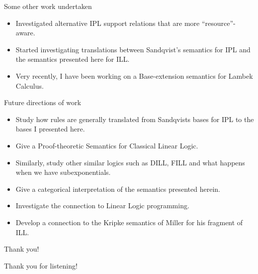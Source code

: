 \documentclass{beamer}
\begin{document}
\begin{frame}{Some other work undertaken}
	\begin{itemize}
		\item Investigated alternative IPL support relations that are more ``resource''-aware.
		\item Started investigating translations between Sandqvist's semantics for IPL and the semantics presented here for ILL.
		\item Very recently, I have been working on a Base-extension semantics for Lambek Calculus.
	\end{itemize}
\end{frame}
\begin{frame}{Future directions of work}
	\begin{itemize}
		\item Study how rules are generally translated from Sandqvists bases for IPL to the bases I presented here.
		\item Give a Proof-theoretic Semantics for Classical Linear Logic.
		\item Similarly, study other similar logics such as DILL, FILL and what happens when we have subexponentials.
		\item Give a categorical interpretation of the semantics presented herein.
		\item Investigate the connection to Linear Logic programming.
		\item Develop a connection to the Kripke semantics of Miller for his fragment of ILL.
	\end{itemize}
\end{frame}
\begin{frame}{Thank you!}
\begin{center}
Thank you for listening!
\end{center}
\end{frame}
\end{document}
